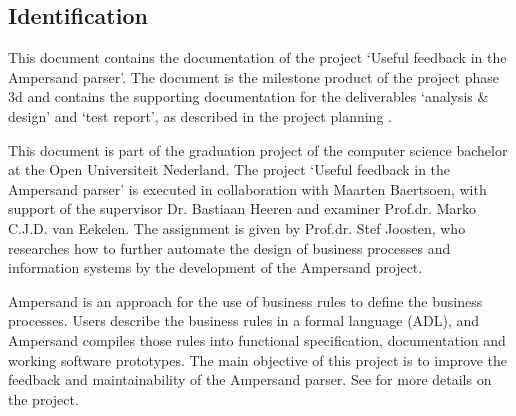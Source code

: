 
\subsection{Identification}
This document contains the documentation of the project `Useful feedback in the Ampersand parser'.
The document is the milestone product of the project phase 3d and contains the supporting documentation for the deliverables `analysis \& design' and `test report', as described in the project planning .

This document is part of the graduation project of the computer science bachelor at the Open Universiteit Nederland.
The project `Useful feedback in the Ampersand parser' is executed in collaboration with Maarten Baertsoen, with support of the supervisor Dr. Bastiaan Heeren and examiner Prof.dr. Marko C.J.D. van Eekelen.
The assignment is given by Prof.dr. Stef Joosten, who researches how to further automate the design of business processes and information systems by the development of the Ampersand project.

Ampersand is an approach for the use of business rules to define the business processes.
Users describe the business rules in a formal language (ADL), and Ampersand compiles those rules into functional specification, documentation and working software prototypes.
The main objective of this project is to improve the feedback and maintainability of the Ampersand parser.
See  for more details on the project.
